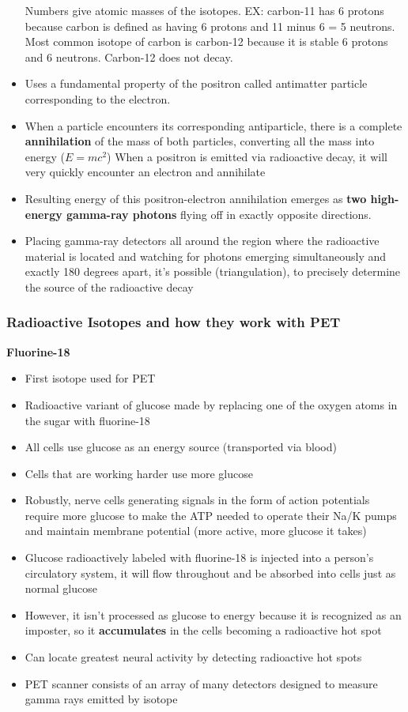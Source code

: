 \documentclass{article}
\begin{document}
\begin{itemize}
        \subitem Numbers give atomic masses of the isotopes. 
        \subitem EX: carbon-11 has 6 protons because carbon is defined as having 6 protons and 11 minus 6 = 5 neutrons. Most common isotope of carbon is carbon-12 because it is stable 6 protons and 6 neutrons. Carbon-12 does not decay. 
    \item Uses a fundamental property of the positron called antimatter particle corresponding to the electron. 
    \item When a particle encounters its corresponding antiparticle, there is a complete \textbf{annihilation} of the mass of both particles, converting all the mass into energy ($E = mc^2$)
        \subitem When a positron is emitted via radioactive decay, it will very quickly encounter an electron and annihilate
    \item Resulting energy of this positron-electron annihilation emerges as \textbf{two high-energy gamma-ray photons} flying off in exactly opposite directions. 
    \item Placing gamma-ray detectors all around the region where the radioactive material is located and watching for photons emerging simultaneously and exactly 180 degrees apart, it's possible (triangulation), to precisely determine the source of the radioactive decay 
\end{itemize}

\subsubsection{Radioactive Isotopes and how they work with PET}
\noindent \textbf{Fluorine-18}
\begin{itemize}
    \item First isotope used for PET
    \item Radioactive variant of glucose made by replacing one of the oxygen atoms in the sugar with fluorine-18
    \item All cells use glucose as an energy source (transported via blood)
    \item Cells that are working harder use more glucose
    \item Robustly, nerve cells generating signals in the form of action potentials require more glucose to make the ATP needed to operate their Na/K pumps and maintain membrane potential (more active, more glucose it takes) 
    \item Glucose radioactively labeled with fluorine-18 is injected into a person's circulatory system, it will flow throughout and be absorbed into cells just as normal glucose
    \item However, it isn't processed as glucose to energy because it is recognized as an imposter, so it \textbf{accumulates} in the cells becoming a radioactive hot spot
    \item Can locate greatest neural activity by detecting radioactive hot spots 
    \item PET scanner consists of an array of many detectors designed to measure gamma rays emitted by isotope
\end{itemize}
\end{document}
